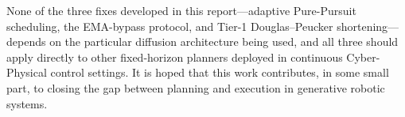 \documentclass[12pt, a4paper, oneside]{report}
\theoremstyle{definition}
\begin{document}
None of the three fixes developed in this report---adaptive
Pure-Pursuit scheduling, the EMA-bypass protocol, and Tier-1
Douglas--Peucker shortening---depends on the particular diffusion
architecture being used, and all three should apply directly to
other fixed-horizon planners deployed in continuous Cyber-Physical
control settings. It is hoped that this work contributes, in some
small part, to closing the gap between planning and execution in
generative robotic systems.


{}


%
%
%
%
%
%
%
%
%
%
\end{document}
